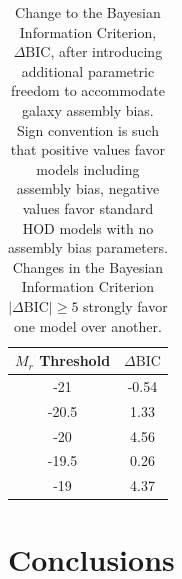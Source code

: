 \documentclass[usenatbib,usegraphicx,letterpaper]{mn2e}
\begin{document}
\begin{table}
\begin{center}
{\renewcommand{\arraystretch}{1.3}
\renewcommand{\tabcolsep}{0.2cm}
\begin{tabular}{c c}
\hline
\hline
$M_r$ Threshold & $\Delta \mathrm{BIC}$ \\
\hline
-21 & -0.54 \\
-20.5 & 1.33 \\
-20 & 4.56\\
-19.5 & 0.26\\
-19 & 4.37\\
\hline
\end{tabular}
\medskip
\caption{
Change to the Bayesian Information Criterion, $\Delta \mathrm{BIC}$,
after introducing additional parametric freedom to accommodate galaxy
assembly bias. Sign convention is such that positive values favor models including
assembly bias, negative values favor standard HOD models with no assembly bias parameters. Changes in
the Bayesian Information Criterion $\vert \Delta \mathrm{BIC}\vert \ge 5$ strongly favor one model
over another.
}
 }
 \label{table:priors}
 \end{center}
\end{table}

\section{Conclusions}
\label{section:conclusions}
\end{document}
